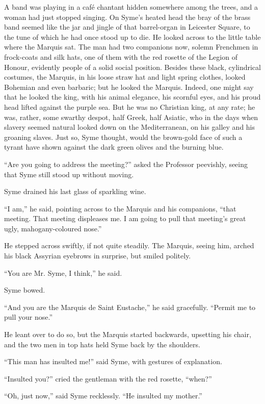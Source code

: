 A band was playing in a café chantant hidden somewhere among the trees, and a woman had just stopped singing. On Syme’s heated head the bray of the brass band seemed like the jar and jingle of that barrel-organ in Leicester Square, to the tune of which he had once stood up to die. He looked across to the little table where the Marquis sat. The man had two companions now, solemn Frenchmen in frock-coats and silk hats, one of them with the red rosette of the Legion of Honour, evidently people of a solid social position. Besides these black, cylindrical costumes, the Marquis, in his loose straw hat and light spring clothes, looked Bohemian and even barbaric; but he looked the Marquis. Indeed, one might say that he looked the king, with his animal elegance, his scornful eyes, and his proud head lifted against the purple sea. But he was no Christian king, at any rate; he was, rather, some swarthy despot, half Greek, half Asiatic, who in the days when slavery seemed natural looked down on the Mediterranean, on his galley and his groaning slaves. Just so, Syme thought, would the brown-gold face of such a tyrant have shown against the dark green olives and the burning blue.

“Are you going to address the meeting?” asked the Professor peevishly, seeing that Syme still stood up without moving.

Syme drained his last glass of sparkling wine.

“I am,” he said, pointing across to the Marquis and his companions, “that meeting. That meeting displeases me. I am going to pull that meeting’s great ugly, mahogany-coloured nose.”

He stepped across swiftly, if not quite steadily. The Marquis, seeing him, arched his black Assyrian eyebrows in surprise, but smiled politely.

“You are Mr. Syme, I think,” he said.

Syme bowed.

“And you are the Marquis de Saint Eustache,” he said gracefully. “Permit me to pull your nose.”

He leant over to do so, but the Marquis started backwards, upsetting his chair, and the two men in top hats held Syme back by the shoulders.

“This man has insulted me!” said Syme, with gestures of explanation.

“Insulted you?” cried the gentleman with the red rosette, “when?”

“Oh, just now,” said Syme recklessly. “He insulted my mother.”

